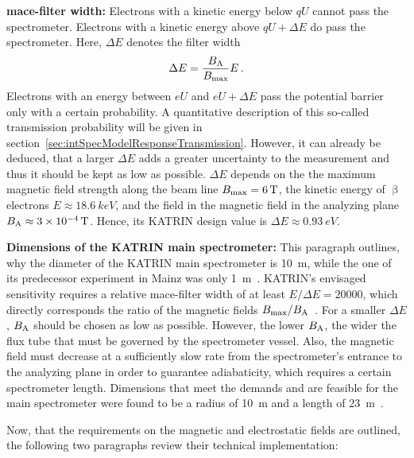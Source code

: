 {\par \textbf{\gls{mace}-filter width:} 
Electrons with a kinetic energy below $qU$ cannot pass the spectrometer. Electrons with a kinetic energy above $qU+\Delta E$ do pass the spectrometer. Here, $\Delta E$ denotes the filter width \cite{Angrik:2005ep}
\begin{equation}
\Delta E = \frac{B_\mathrm{A}}{B_\mathrm{max}} E
\text{\,.}
\end{equation}
Electrons with an energy between $eU$ and $eU+\Delta E$ pass the potential barrier only with a certain probability. A quantitative description of this so-called transmission probability will be given in section~\ref{sec:intSpecModelResponseTransmission}. However, it can already be deduced, that a larger $\Delta E$ adds a greater uncertainty to the measurement and thus it should be kept as low as possible. $\Delta E$ depends on the the maximum magnetic field strength along the beam line $B_\mathrm{max}=\SI{6}{T}$, the kinetic energy of $\upbeta$ electrons $E\approx\SI{18.6}{keV}$, and the field in the magnetic field in the analyzing plane $B_\mathrm{A}\approx\SI{3e-4}{T}$. Hence, its KATRIN design value is $\Delta E\approx\SI{0.93}{eV}$. }

{\par \textbf{Dimensions of the KATRIN main spectrometer:} This paragraph outlines, why the diameter of the KATRIN main spectrometer is \SI{10}{m}, while the one of its predecessor experiment in Mainz was only \SI{1}{m}~\cite{Kraus2005}. KATRIN's envisaged sensitivity requires a relative \gls{mace}-filter width of at least $E/\Delta E = 20000$, which directly corresponds the ratio of the magnetic fields $B_\mathrm{max}/B_\mathrm{A}$~\cite{Angrik:2005ep}. For a smaller $\Delta E$, $B_\mathrm{A}$ should be chosen as low as possible. However, the lower $B_\mathrm{A}$, the wider the flux tube that must be governed by the spectrometer vessel. Also, the magnetic field must decrease at a sufficiently slow rate from the spectrometer's entrance to the analyzing plane in order to guarantee adiabaticity, which requires a certain spectrometer length. Dimensions that meet the demands and are feasible for the main spectrometer were found to be a radius of \SI{10}{m} and a length of \SI{23}{m}~\cite{Angrik:2005ep, Valerius2009}.}

Now, that the requirements on the magnetic and electrostatic fields are outlined, the following two paragraphs review their technical implementation:

